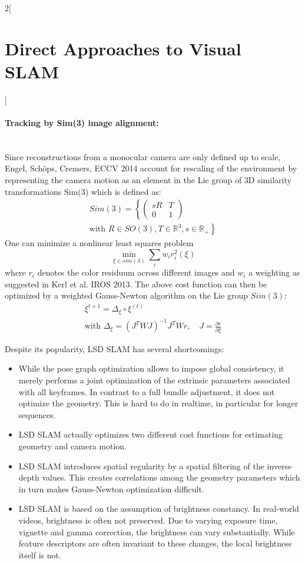 \documentclass[oneside,fontsize=11pt,paper=a4]{scrartcl}
\begin{document}
\begin{multicols}{2}[\section{Direct Approaches to Visual SLAM}]
\paragraph{Tracking by Sim(3) image alignment:}\mbox{}\\
Since reconstructions from a monocular camera are only defined up to scale, Engel, Schöps, Cremers, ECCV 2014 account for rescaling of the environment by representing the camera motion as an element in the Lie group of 3D similarity transformations Sim(3) which is defined as:
\begin{equation*}
\begin{split}
    Sim(3) = \left\{\begin{pmatrix}sR & T\\ 0 & 1 \end{pmatrix} \right. \\ \left. \text{with } R \in SO(3), T \in \mathbb{R}^3, s \in \mathbb{R_{+}}\right\}
\end{split}
\end{equation*}
One can minimize a nonlinear least squares problem
\begin{equation*}
    \min_{\xi \in sim(3)} \sum_i w_i r_i^2 (\xi)
\end{equation*}
where $r_i$ denotes the color residuum across different images and $w_i$ a weighting as suggested in Kerl et al. IROS 2013.
The above cost function can then be optimized by a weighted Gauss-Newton algorithm on the Lie group $Sim(3)$:
\begin{equation*}
\begin{split}
    \xi^{t+1} = \Delta_{\xi} \circ \xi^{(t)} \\ \text{with } \Delta_{\xi} = (J^T W J)^{-1} J^T W r, \quad J = \frac{\partial r}{\partial \xi}
\end{split}
\end{equation*}

Despite its popularity, LSD SLAM has several shortcomings:
\begin{itemize}
\item While the pose graph optimization allows to impose global consistency, it merely performs a joint optimization of the extrinsic parameters associated with all keyframes. In contrast to a full bundle adjustment, it does not optimize the geometry. This is hard to do in realtime, in particular for longer sequences.
\item LSD SLAM actually optimizes two different cost functions for estimating geometry and camera motion.
\item LSD SLAM introduces spatial regularity by a spatial filtering of the inverse depth values. This creates correlations among the geometry parameters which in turn makes Gauss-Newton optimization difficult.
\item LSD SLAM is based on the assumption of brightness constancy. In real-world videos, brightness is often not preserved. Due to varying exposure time, vignette and gamma correction, the brightness can vary substantially. While feature descriptors are often invariant to these changes, the local brightness itself is not.
\end{itemize}


\end{multicols}
\end{document}
